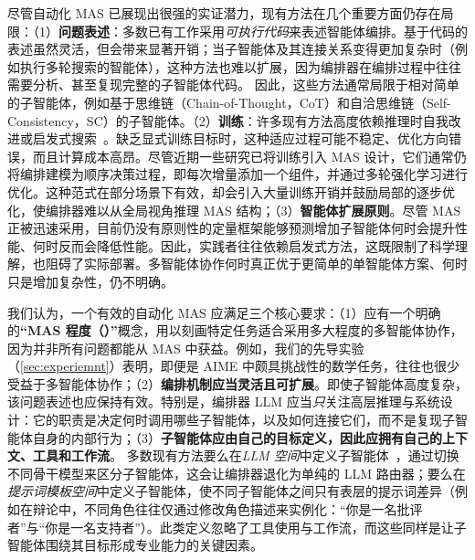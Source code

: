 尽管自动化 MAS 已展现出很强的实证潜力，现有方法在几个重要方面仍存在局限：（1）\textbf{问题表述}：多数已有工作\citep{Ke2025MASZero,nie2025weakforstrong,hu2024ADAS}采用\textit{可执行代码}来表述智能体编排。基于代码的表述虽然灵活，但会带来显著开销；当子智能体及其连接关系变得更加复杂时（例如执行多轮搜索的智能体），这种方法也难以扩展，因为编排器在编排过程中往往需要分析、甚至复现完整的子智能体代码。
因此，这些方法通常局限于相对简单的子智能体，例如基于思维链（Chain-of-Thought，CoT）\citep{wei2022chain}和自洽思维链（Self-Consistency，SC）\citep{wang2023selfconsistency}的子智能体。（2）\textbf{训练}：许多现有方法高度依赖推理时自我改进或启发式搜索~\citep{zhang2024aflowautomatingagenticworkflow,liu2024dynamicllmpowered}。缺乏显式训练目标时，这种适应过程可能不稳定、优化方向错误，而且计算成本高昂。尽管近期一些研究已将训练引入 MAS 设计\citep{dang2025multiagentcollaborationevolvingorchestration,chi2025eraagenticorganizationlearning}，它们通常仍将编排建模为顺序决策过程，即每次增量添加一个组件，并通过多轮强化学习进行优化。这种范式在部分场景下有效，却会引入大量训练开销并鼓励局部的逐步优化，使编排器难以从全局视角推理 MAS 结构；（3）\textbf{智能体扩展原则}\citep{li2024more,qian2025scaling}。尽管 MAS 正被迅速采用，目前仍没有原则性的定量框架能够预测增加子智能体何时会提升性能、何时反而会降低性能。因此，实践者往往依赖启发式方法，这既限制了科学理解，也阻碍了实际部署。多智能体协作何时真正优于更简单的单智能体方案、何时只是增加复杂性，仍不明确\citep{kim2025sciencescalingagentsystems,huang2024large}。



我们认为，一个有效的自动化 MAS 应满足三个核心要求：（1）应有一个明确的\textbf{“MAS 程度（\masness）”}概念，用以刻画特定任务适合采用多大程度的多智能体协作，因为并非所有问题都能从 MAS 中获益。例如，我们的先导实验（\cref{sec:experiemnt}）表明，即便是 AIME 中颇具挑战性的数学任务，往往也很少受益于多智能体协作；（2）\textbf{编排机制应当灵活且可扩展}。即使子智能体高度复杂，该问题表述也应保持有效。特别是，编排器 LLM 应当\textit{只}关注高层推理与系统设计：它的职责是决定何时调用哪些子智能体，以及如何连接它们，而不是复现子智能体自身的内部行为；（3）\textbf{子智能体应由自己的目标定义，因此应拥有自己的上下文、工具和工作流}\cite{anthropic_subagents_2024}。
多数现有方法要么在\textit{LLM 空间}中定义子智能体~\cite{jin2025controllingperformancebudgetcentralized,estornell2025trainleaderhierarchicalreasoning,dang2025multiagentcollaborationevolvingorchestration}，通过切换不同骨干模型来区分子智能体，这会让编排器退化为单纯的 LLM 路由器；要么在\textit{提示词模板空间}中定义子智能体，使不同子智能体之间只有表层的提示词差异（例如在辩论中，不同角色往往仅通过修改角色描述来实例化：“你是一名批评者”与“你是一名支持者”）。此类定义忽略了工具使用与工作流，而这些同样是让子智能体围绕其目标形成专业能力的关键因素。

